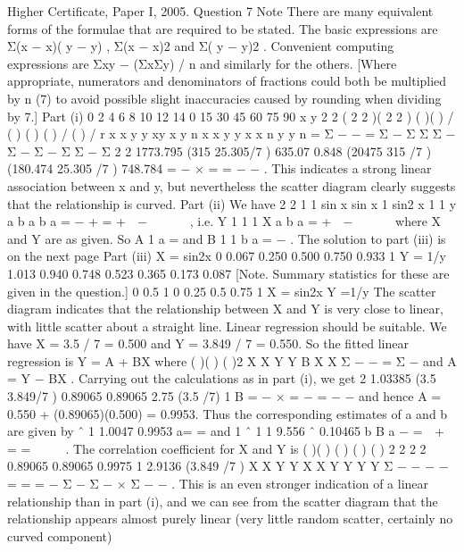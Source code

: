 \documentclass[a4paper,12pt]{article}
\begin{document}
Higher Certificate, Paper I, 2005. Question 7
Note There are many equivalent forms of the formulae that are required to be stated.
The basic expressions are Σ(x − x)( y − y) , Σ(x − x)2 and Σ( y − y)2 . Convenient
computing expressions are Σxy − (ΣxΣy) / n and similarly for the others. [Where
appropriate, numerators and denominators of fractions could both be multiplied by n
(7) to avoid possible slight inaccuracies caused by rounding when dividing by 7.]
Part (i)
0
2
4
6
8
10
12
14
0 15 30 45 60 75 90
x
y
2 2 ( 2 2 )( 2 2 )
( )( ) /
( ) ( ) ( ) / ( ) /
r x x y y xy x y n
x x y y x x n y y n
= Σ − − = Σ − Σ Σ
Σ − Σ − Σ − Σ Σ − Σ
2 2
1773.795 (315 25.305/7 ) 635.07 0.848
(20475 315 /7 )(180.474 25.305 /7 ) 748.784
= − × = =
− −
.
This indicates a strong linear association between x and y, but nevertheless the scatter
diagram clearly suggests that the relationship is curved.
Part (ii)
We have
2 2
1 1 sin x sin x 1 sin2 x 1 1
y a b a b a
= − + = +  −   
 
, i.e. Y 1 1 1 X
a b a
= +  −   
 
where
X and Y are as given.
So A 1
a
= and B 1 1
b a
= − .
The solution to part (iii) is on the next page
Part (iii)
X = sin2x 0 0.067 0.250 0.500 0.750 0.933 1
Y = 1/y 1.013 0.940 0.748 0.523 0.365 0.173 0.087
[Note. Summary statistics for these are given in the question.]
0
0.5
1
0 0.25 0.5 0.75 1
X = sin2x
Y
=1/y
The scatter diagram indicates that the relationship between X and Y is very close to
linear, with little scatter about a straight line. Linear regression should be suitable.
We have X = 3.5 / 7 = 0.500 and Y = 3.849 / 7 = 0.550.
So the fitted linear regression is Y = A + BX where ( )( )
( )2
X X Y Y
B
X X
Σ − −
=
Σ −
and
A = Y − BX .
Carrying out the calculations as in part (i), we get
2
1.03385 (3.5 3.849/7 ) 0.89065 0.89065
2.75 (3.5 /7) 1
B = − × = − = −
−
and hence A = 0.550 + (0.89065)(0.500) = 0.9953.
Thus the corresponding estimates of a and b are given by ˆ 1 1.0047
0.9953
a= = and
1 ˆ 1 1 9.556
ˆ 0.10465
b B
a
− =  +  = =  
 
.
The correlation coefficient for X and Y is
( )( )
( ) ( ) ( ) 2 2 2 2
0.89065 0.89065 0.9975
1 2.9136 (3.849 /7 )
X X Y Y
X X Y Y Y Y
Σ − − − − = = = −
Σ − Σ − × Σ − −
.
This is an even stronger indication of a linear relationship than in part (i), and we can
see from the scatter diagram that the relationship appears almost purely linear (very
little random scatter, certainly no curved component)
\end{document}
